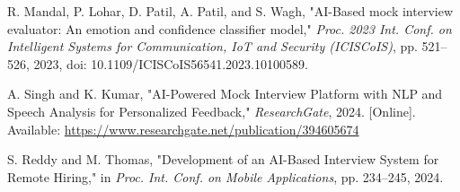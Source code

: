 \documentclass[conference]{IEEEtran}
\begin{document}
\begin{thebibliography}{1}
R. Mandal, P. Lohar, D. Patil, A. Patil, and S. Wagh, "AI-Based mock interview evaluator: An emotion and confidence classifier model," \textit{Proc. 2023 Int. Conf. on Intelligent Systems for Communication, IoT and Security (ICISCoIS)}, pp. 521--526, 2023, doi: 10.1109/ICISCoIS56541.2023.10100589.

A. Singh and K. Kumar, "AI-Powered Mock Interview Platform with NLP and Speech Analysis for Personalized Feedback," \textit{ResearchGate}, 2024. [Online]. Available: \url{https://www.researchgate.net/publication/394605674}

S. Reddy and M. Thomas, "Development of an AI-Based Interview System for Remote Hiring," in \textit{Proc. Int. Conf. on Mobile Applications}, pp. 234--245, 2024.

\end{thebibliography}
\end{document}
